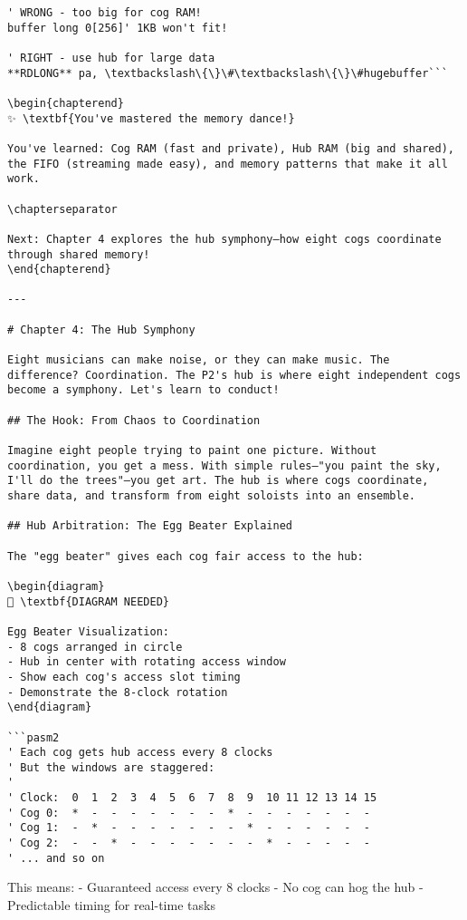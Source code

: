 \documentclass[11pt]{book}
\begin{document}
\begin{lstlisting}
' WRONG - too big for cog RAM!
buffer long 0[256]' 1KB won't fit!

' RIGHT - use hub for large data
**RDLONG** pa, \textbackslash\{\}\#\textbackslash\{\}\#hugebuffer```

\begin{chapterend}
✨ \textbf{You've mastered the memory dance!}

You've learned: Cog RAM (fast and private), Hub RAM (big and shared), the FIFO (streaming made easy), and memory patterns that make it all work.

\chapterseparator

Next: Chapter 4 explores the hub symphony—how eight cogs coordinate through shared memory!
\end{chapterend}

---

# Chapter 4: The Hub Symphony

Eight musicians can make noise, or they can make music. The difference? Coordination. The P2's hub is where eight independent cogs become a symphony. Let's learn to conduct!

## The Hook: From Chaos to Coordination

Imagine eight people trying to paint one picture. Without coordination, you get a mess. With simple rules—"you paint the sky, I'll do the trees"—you get art. The hub is where cogs coordinate, share data, and transform from eight soloists into an ensemble.

## Hub Arbitration: The Egg Beater Explained

The "egg beater" gives each cog fair access to the hub:

\begin{diagram}
🎨 \textbf{DIAGRAM NEEDED}

Egg Beater Visualization:
- 8 cogs arranged in circle
- Hub in center with rotating access window
- Show each cog's access slot timing
- Demonstrate the 8-clock rotation
\end{diagram}

```pasm2
' Each cog gets hub access every 8 clocks
' But the windows are staggered:
' 
' Clock:  0  1  2  3  4  5  6  7  8  9  10 11 12 13 14 15
' Cog 0:  *  -  -  -  -  -  -  -  *  -  -  -  -  -  -  -
' Cog 1:  -  *  -  -  -  -  -  -  -  *  -  -  -  -  -  -
' Cog 2:  -  -  *  -  -  -  -  -  -  -  *  -  -  -  -  -
' ... and so on
\end{lstlisting}

This means: - Guaranteed access every 8 clocks - No cog can hog the hub
- Predictable timing for real-time tasks
\end{document}
